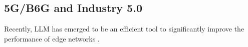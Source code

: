 \documentclass[acmsmall,nonacm]{acmart}
\begin{document}
    \subsection{5G/B6G and Industry 5.0}
    Recently, LLM has emerged to be an efficient tool to significantly improve the performance of edge networks \cite{10384606, 10638533, 10639525}. 
        
         
         
         
         
         
         
\end{document}
